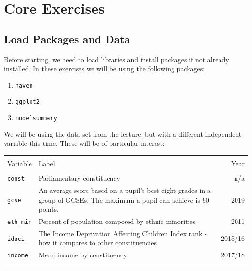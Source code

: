 \documentclass[12pt,a4paper]{article}
\makeatletter
\renewenvironment{table}[1][]{%
 \ifthenelse{\equal{#1}{}}{%
   \@float{table}
 }{%
   \@float{table}[#1]%
 }%
 \centering
}{%
 \end@float
}
\providecommand{\tightlist}{%
  \setlength{\itemsep}{0pt}\setlength{\parskip}{0pt}}
\makeatother
\begin{document}
\onehalfspacing

\section{Core Exercises}\label{core-exercises}

\subsection{Load Packages and Data}\label{load-packages-and-data}

Before starting, we need to load libraries and install packages if not
already installed. In these exercises we will be using the following
packages:

\begin{enumerate}
\def\labelenumi{\arabic{enumi}.}
\tightlist
\item
  \texttt{haven}
\item
  \texttt{ggplot2}
\item
  \texttt{modelsummary}
\end{enumerate}

We will be using the data set from the lecture, but with a different
independent variable this time. These will be of particular interest:

\begin{table}[!h]
\centering
        \begin{tabularx}{\textwidth}{lXr}
        &  \\[-1.8ex] \hline\hline
        &  \\[-1.8ex]
        Variable    &   Label & Year\\ \hline
        &  \\[-1.8ex]
\texttt{const}  &   Parliamentary constituency  &   n/a \\
\addlinespace

\texttt{gcse}   &   An average score based on a pupil's best eight grades in a group of GCSEs. The maximum a pupil can achieve is 90 points.    &   2019    \\
\addlinespace

\texttt{eth\_min}   &   Percent of population composed by ethnic minorities &   2011 \\
\addlinespace

\texttt{idaci}  &   The Income Deprivation Affecting Children Index rank - how it compares to other constituencies  &   2015/16 \\
\addlinespace

\texttt{income} &   Mean income by constituency &   2017/18 \\
        & \\[-1.8ex]\hline 
\hline & \\[-1.8ex] 
\end{tabularx}
    \caption{Codebook for \texttt{london} Data Set}
    \label{tbl:london}
\end{table}
\end{document}
